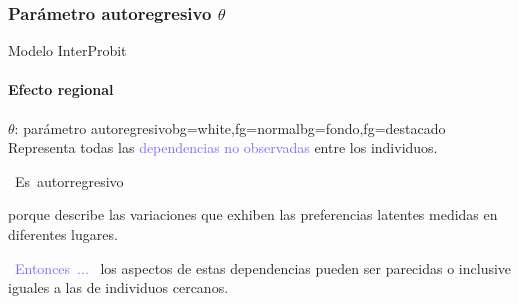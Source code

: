 \subsubsection{Parámetro autoregresivo $\theta$}
\setwatermark{\fontsize{40pt}{40pt}\selectfont{ }}
\begin{frame}{Modelo InterProbit}
\framesubtitle{Efecto regional}

\begin{variableblock}{$\theta$: parámetro autoregresivo}{bg=white,fg=normal}{bg=fondo,fg=destacado}
  Representa todas las \textcolor{mediumslateblue}{dependencias no observadas} entre los individuos. 
\end{variableblock}

\vspace*{.5 cm}
 \hbox{%
\fontsize{20}{20}\selectfont
\textcolor{iris}{Es autorregresivo}
 }

porque describe las variaciones que exhiben las preferencias latentes medidas en diferentes lugares.

\vspace*{.5 cm}
 \hbox{%
\fontsize{20}{20}\selectfont
\textcolor{mediumslateblue}{Entonces ...}
 }
los aspectos de estas dependencias pueden ser parecidas o inclusive iguales a las de individuos cercanos.
\end{frame}

